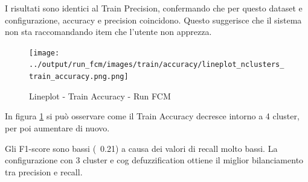 I risultati sono identici al Train Precision, confermando che per questo dataset e configurazione, accuracy e precision coincidono. Questo suggerisce che il sistema non sta raccomandando item che l'utente non apprezza.

\begin{figure}[H]
  \centering
  \texttt{[image: ../output/run\_fcm/images/train/accuracy/lineplot\_nclusters\_train\_accuracy.png.png]}
  \caption{Lineplot - Train Accuracy - Run FCM}
  \label{fig:train_accuracy_fcm}
\end{figure}

In figura \ref{fig:train_accuracy_fcm} si può osservare come il Train Accuracy decresce intorno a 4 cluster, per poi aumentare di nuovo.

\begin{table}[H]
  \centering
  \caption{Top 5 Configurazioni per Train F1-Score - Run FCM}
\end{table}

Gli F1-score sono bassi (~0.21) a causa dei valori di recall molto bassi. La configurazione con 3 cluster e cog defuzzification ottiene il miglior bilanciamento tra precision e recall.

